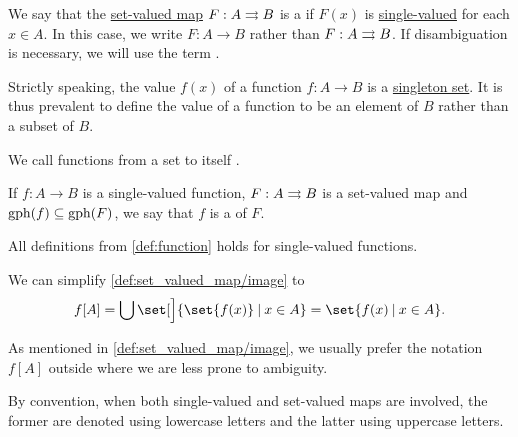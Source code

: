 \begin{definition}\label{def:function}
  We say that the \hyperref[def:function]{set-valued map} \( F: A \rightrightarrows B \) is a  if \( F(x) \) is \hyperref[def:set_valued_map/value]{single-valued} for each \( x \in A \). In this case, we write \( F: A \to B \) rather than \( F: A \rightrightarrows B \). If disambiguation is necessary, we will use the term .

  Strictly speaking, the value \( f(x) \) of a function \( f: A \to B \) is a \hyperref[def:subsingleton_set]{singleton set}. It is thus prevalent to define the value of a function to be an element of \( B \) rather than a subset of \( B \).

  \begin{thmenum}
     We call functions from a set to itself .

    \medskip

     If \( f: A \to B \) is a single-valued function, \( F: A \rightrightarrows B \) is a set-valued map and \( \operatorname{gph}(f) \subseteq \operatorname{gph}(F) \), we say that \( f \) is a  of \( F \).
  \end{thmenum}
\end{definition}
\begin{comments}
  \item All definitions from \cref{def:function} holds for single-valued functions.

  \item We can simplify \cref{def:set_valued_map/image} to
  \begin{equation*}
    f[A]
    =
    \bigcup \set[\Big]{ \set{ f(x) } \given x \in A }
    =
    \set{ f(x) \given x \in A }.
  \end{equation*}

  As mentioned in \cref{def:set_valued_map/image}, we usually prefer the notation \( f[A] \) outside  where we are less prone to ambiguity.

  \item By convention, when both single-valued and set-valued maps are involved, the former are denoted using lowercase letters and the latter using uppercase letters.
\end{comments}

